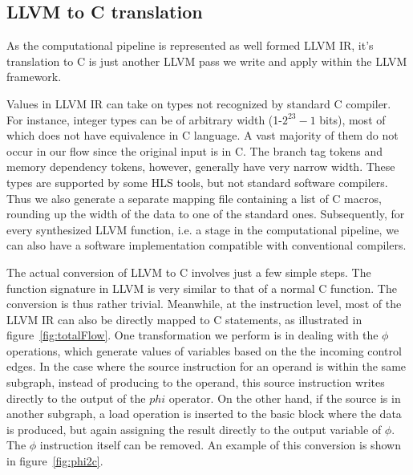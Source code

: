 
\subsection{LLVM to C translation}
As the computational pipeline is represented as well formed LLVM IR, it's translation to C is just another LLVM pass we write and apply within the LLVM framework. 


Values in LLVM IR can take on types not recognized by standard C compiler.
For instance, integer types can be of arbitrary width (1-$2^{23}-1$ bits), most of which does not have equivalence in C language. A vast majority of them do not occur
in our flow since the original input is in C. The branch tag tokens and memory
dependency tokens, however, generally have very narrow width. These types
are supported by some HLS tools, but not standard software compilers. Thus we also generate a separate mapping file containing a list of C macros, rounding up the width of the data to one of the standard ones. Subsequently, for every synthesized LLVM function, i.e. a stage in the computational pipeline, we can also have a software implementation compatible with conventional compilers.

The actual conversion of LLVM to C involves just a few simple steps.
The function signature in LLVM is very similar to that of a normal C function. The conversion is thus rather trivial.
Meanwhile, at the instruction level, 
most of the LLVM IR can also be directly mapped
to C statements, as illustrated in figure~\ref{fig:totalFlow}. One
transformation we perform is in dealing with the $\phi$ operations, which generate
 values of variables based on the the incoming control edges.  In the case where the source instruction for an operand is within the same subgraph, instead of
 producing to the operand, this source instruction writes directly to the output
 of the $phi$ operator.
 On the other hand, if the source
is in another subgraph, a load operation is inserted to the basic block
where the data is produced, but again assigning the result directly
to the output variable of $\phi$. The $\phi$
instruction itself can be removed. An example of this conversion is
shown in figure~\ref{fig:phi2c}.

